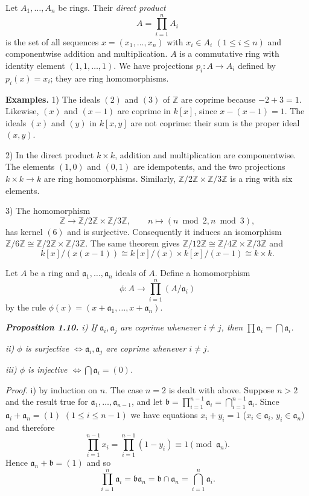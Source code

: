 Let $A_1,\ldots,A_n$ be rings.  Their \emph{direct product}
\[
A=\prod_{i=1}^n A_i
\]
is the set of all sequences $x=(x_1,\ldots,x_n)$ with $x_i\in A_i$ $(1\leq i\leq n)$ and componentwise addition and multiplication.  $A$ is a commutative ring with identity
element $(1,1,\ldots,1)$.  We have projections $p_i:A\longrightarrow A_i$ defined by $p_i(x)=x_i$;
they are ring homomorphisms.

\textline
\noindent\textbf{Examples.} 1) The ideals $(2)$ and $(3)$ of $\mathbb Z$ are
coprime because $-2+3=1$.  Likewise, $(x)$ and $(x-1)$ are coprime in $k[x]$,
since $x-(x-1)=1$.  The ideals $(x)$ and $(y)$ in $k[x,y]$ are not coprime:
their sum is the proper ideal $(x,y)$.

2) In the direct product $k\times k$, addition and multiplication are
componentwise.  The elements $(1,0)$ and $(0,1)$ are idempotents, and the two
projections $k\times k\longrightarrow k$ are ring homomorphisms.  Similarly,
$\mathbb Z/2\mathbb Z\times\mathbb Z/3\mathbb Z$ is a ring with six elements.

3) The homomorphism
\[
\mathbb Z\longrightarrow\mathbb Z/2\mathbb Z\times\mathbb Z/3\mathbb Z,
\qquad n\longmapsto(n\bmod2,n\bmod3),
\]
has kernel $(6)$ and is surjective.  Consequently it induces an isomorphism
$\mathbb Z/6\mathbb Z\cong\mathbb Z/2\mathbb Z\times\mathbb Z/3\mathbb Z$.
The same theorem gives $\mathbb Z/12\mathbb Z\cong
\mathbb Z/4\mathbb Z\times\mathbb Z/3\mathbb Z$ and
\[
k[x]/(x(x-1))\cong k[x]/(x)\times k[x]/(x-1)\cong k\times k.
\]
\textline

Let $A$ be a ring and $\mathfrak a_1,\ldots,\mathfrak a_n$ ideals of $A$.  Define a homomorphism
\[
\phi:A\longrightarrow\prod_{i=1}^n(A/\mathfrak a_i)
\]
by the rule $\phi(x)=(x+\mathfrak a_1,\ldots,x+\mathfrak a_n)$.

\medskip
\noindent\textit{\textbf{Proposition 1.10.} i) If $\mathfrak a_i,\mathfrak a_j$ are coprime whenever $i\ne j$, then $\prod\mathfrak a_i=\bigcap\mathfrak a_i$.}

\noindent\textit{ii) $\phi$ is surjective $\Longleftrightarrow\mathfrak a_i,\mathfrak a_j$ are coprime whenever $i\ne j$.}

\noindent\textit{iii) $\phi$ is injective $\Longleftrightarrow\bigcap\mathfrak a_i=(0)$.}

\noindent\emph{Proof.}  i) by induction on $n$.  The case $n=2$ is dealt with above.  Suppose
$n>2$ and the result true for $\mathfrak a_1,\ldots,\mathfrak a_{n-1}$, and let $\mathfrak b=\prod_{i=1}^{n-1}\mathfrak a_i=\bigcap_{i=1}^{n-1}\mathfrak a_i$.  Since
$\mathfrak a_i+\mathfrak a_n=(1)$ $(1\leq i\leq n-1)$ we have equations $x_i+y_i=1$ ($x_i\in\mathfrak a_i$, $y_i\in\mathfrak a_n$)
and therefore
\[
\prod_{i=1}^{n-1}x_i=\prod_{i=1}^{n-1}(1-y_i)\equiv1\pmod{\mathfrak a_n}.
\]
Hence $\mathfrak a_n+\mathfrak b=(1)$ and so
\[
\prod_{i=1}^n\mathfrak a_i=\mathfrak b\mathfrak a_n=\mathfrak b\cap\mathfrak a_n=\bigcap_{i=1}^n\mathfrak a_i.
\]

